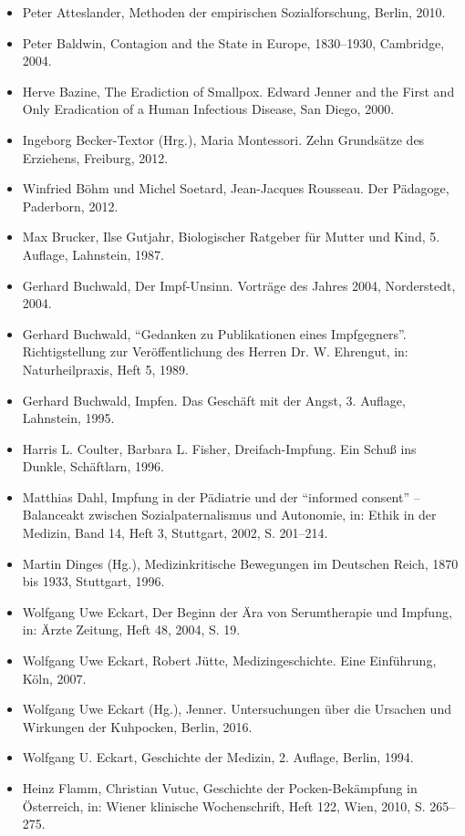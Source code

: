 \documentclass[
    a4paper,
    12pt,
    hyphens,
    chapterprefix=true,
    headheight=33pt,
    footheight=29pt,
    headings=optiontohead, %
]{scrartcl}
\begin{document}
{\begin{itemize}
\item{Peter Atteslander, Methoden der empirischen Sozialforschung, Berlin, 2010.}
\item{Peter Baldwin, Contagion and the State in Europe, 1830--1930, Cambridge, 2004.}
\item{Herve Bazine, The Eradiction of Smallpox. Edward Jenner and the First and Only Eradication of a Human Infectious Disease, San Diego, 2000.}
\item{Ingeborg Becker-Textor (Hrg.), Maria Montessori. Zehn Grundsätze des Erziehens, Freiburg, 2012.}
\item{Winfried Böhm und Michel Soetard, Jean-Jacques Rousseau. Der Pädagoge, Paderborn, 2012.}
\item{Max Brucker, Ilse Gutjahr, Biologischer Ratgeber für Mutter und Kind, 5. Auflage, Lahnstein, 1987.}
\item{Gerhard Buchwald, Der Impf-Unsinn. Vorträge des Jahres 2004, Norderstedt, 2004.}
\item{Gerhard Buchwald, "`Gedanken zu Publikationen eines Impfgegners"'. Richtigstellung zur Veröffentlichung des Herren Dr. W. Ehrengut, in: Naturheilpraxis, Heft 5, 1989.}
\item{Gerhard Buchwald, Impfen. Das Geschäft mit der Angst, 3. Auflage, Lahnstein, 1995.}
\item{Harris L. Coulter, Barbara L. Fisher, Dreifach-Impfung. Ein Schuß ins Dunkle, Schäftlarn, 1996.}
\item{Matthias Dahl, Impfung in der Pädiatrie und der "`informed consent"' -- Balanceakt zwischen Sozialpaternalismus und Autonomie, in: Ethik in der Medizin, Band 14, Heft 3, Stuttgart, 2002, S. 201--214.}
\item{Martin Dinges (Hg.), Medizinkritische Bewegungen im Deutschen Reich, 1870 bis 1933, Stuttgart, 1996.}
\item{Wolfgang Uwe Eckart, Der Beginn der Ära von Serumtherapie und Impfung, in: Ärzte Zeitung, Heft 48, 2004, S. 19.}
\item{Wolfgang Uwe Eckart, Robert Jütte, Medizingeschichte. Eine Einführung, Köln, 2007.}
\item{Wolfgang Uwe Eckart (Hg.), Jenner. Untersuchungen über die Ursachen und Wirkungen der Kuhpocken, Berlin, 2016.}
\item{Wolfgang U. Eckart, Geschichte der Medizin, 2. Auflage, Berlin, 1994.}
\item{Heinz Flamm, Christian Vutuc, Geschichte der Pocken-Bekämpfung in Österreich, in: Wiener klinische Wochenschrift, Heft 122, Wien, 2010, S. 265--275.}

\end{itemize}}
\end{document}
